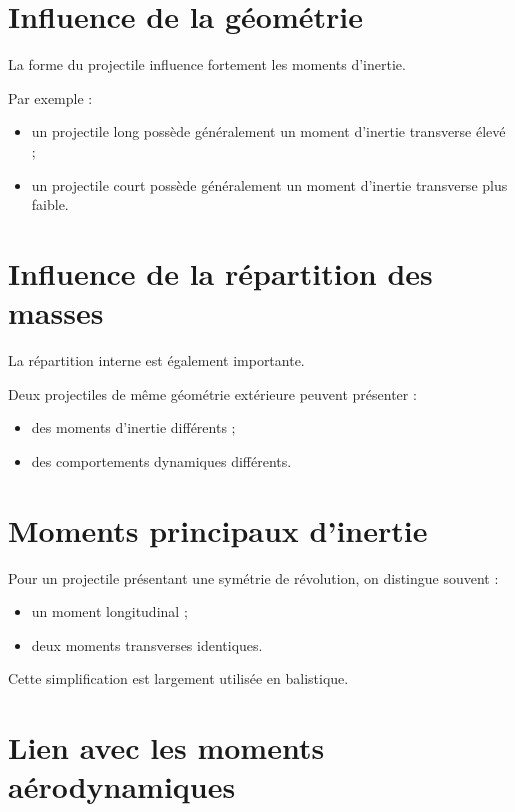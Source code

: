 \section{Influence de la géométrie}

La forme du projectile influence fortement les moments d'inertie.

Par exemple :

\begin{itemize}
    \item un projectile long possède généralement un moment d'inertie
          transverse élevé ;
    \item un projectile court possède généralement un moment d'inertie
          transverse plus faible.
\end{itemize}

\section{Influence de la répartition des masses}

La répartition interne est également importante.

Deux projectiles de même géométrie extérieure peuvent présenter :

\begin{itemize}
    \item des moments d'inertie différents ;
    \item des comportements dynamiques différents.
\end{itemize}

\section{Moments principaux d'inertie}

Pour un projectile présentant une symétrie de révolution, on distingue
souvent :

\begin{itemize}
    \item un moment longitudinal ;
    \item deux moments transverses identiques.
\end{itemize}

Cette simplification est largement utilisée en balistique.

\section{Lien avec les moments aérodynamiques}

